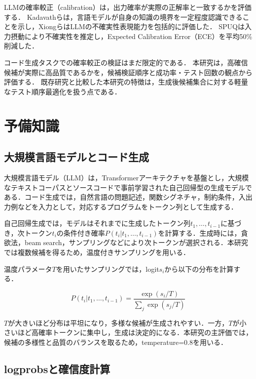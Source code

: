 \documentclass[submit,techrep,noauthor]{ipsj}
\begin{document}
LLMの確率較正（calibration）は，出力確率が実際の正解率と一致するかを評価する．
Kadavathら\cite{kadavath2022language}は，言語モデルが自身の知識の境界を一定程度認識できることを示し，Xiongら\cite{xiong2023can}はLLMの不確実性表現能力を包括的に評価した．
SPUQ\cite{spuq2024}は入力摂動により不確実性を推定し，Expected Calibration Error（ECE）を平均50\%削減した．

コード生成タスクでの確率較正の検証はまだ限定的である．
本研究は，高確信候補が実際に高品質であるかを，候補検証順序と成功率・テスト回数の観点から評価する．
既存研究と比較した本研究の特徴は，生成後候補集合に対する軽量なテスト順序最適化を扱う点である．

\section{予備知識}

\subsection{大規模言語モデルとコード生成}

大規模言語モデル（LLM）は，Transformerアーキテクチャを基盤とし，大規模なテキストコーパスとソースコードで事前学習された自己回帰型の生成モデルである．コード生成では，自然言語の問題記述，関数シグネチャ，制約条件，入出力例などを入力として，対応するプログラムをトークン列として生成する．

自己回帰生成では，モデルはそれまでに生成したトークン列$t_1,\ldots,t_{i-1}$に基づき，次トークン$t_i$の条件付き確率$P(t_i|t_1,\ldots,t_{i-1})$を計算する．生成時には，貪欲法，beam search，サンプリングなどにより次トークンが選択される．本研究では複数候補を得るため，温度付きサンプリングを用いる．

温度パラメータ$T$を用いたサンプリングでは，logit$s_i$から以下の分布を計算する．

\begin{equation}
P(t_i | t_1,\ldots,t_{i-1}) =
\frac{\exp(s_i/T)}{\sum_j \exp(s_j/T)}
\end{equation}

$T$が大きいほど分布は平坦になり，多様な候補が生成されやすい．一方，$T$が小さいほど高確率トークンに集中し，生成は決定的になる．本研究の主評価では，候補の多様性と品質のバランスを取るため，temperature=0.8を用いる．

\subsection{logprobsと確信度計算}
\end{document}
